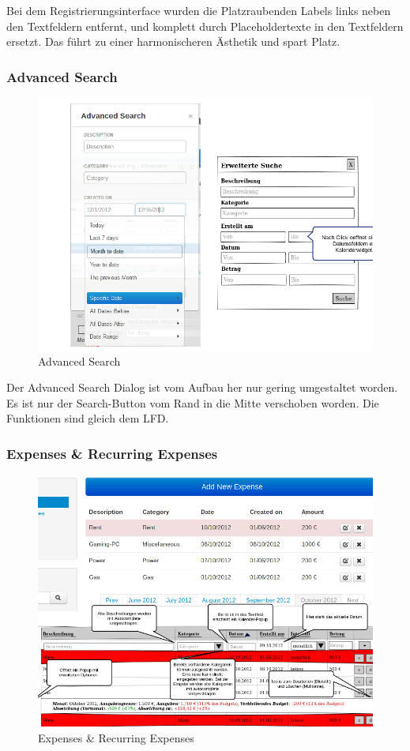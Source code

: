 \documentclass[a4paper,10pt]{article}
\begin{document}
Bei dem Registrierungsinterface wurden die Platzraubenden Labels links neben den Textfeldern entfernt, 
und komplett durch Placeholdertexte in den Textfeldern ersetzt. Das f\"uhrt zu einer harmonischeren \"Asthetik und spart Platz.

\clearpage
\subsubsection{Advanced Search}

\begin{figure}
\centering
\includegraphics[width=\textwidth]{advanced-search}
\caption{Advanced Search} \label{fig:advanced-search}
\end{figure}

Der Advanced Search Dialog ist vom Aufbau her nur gering umgestaltet worden. Es ist nur der Search-Button vom Rand in die
Mitte verschoben worden. Die Funktionen sind gleich dem LFD.

\clearpage
\subsubsection{Expenses \& Recurring Expenses}

\begin{figure}
\centering
\includegraphics[width=\textwidth]{expenses}
\caption{Expenses \& Recurring Expenses} \label{fig:expenses}
\end{figure}
\end{document}
